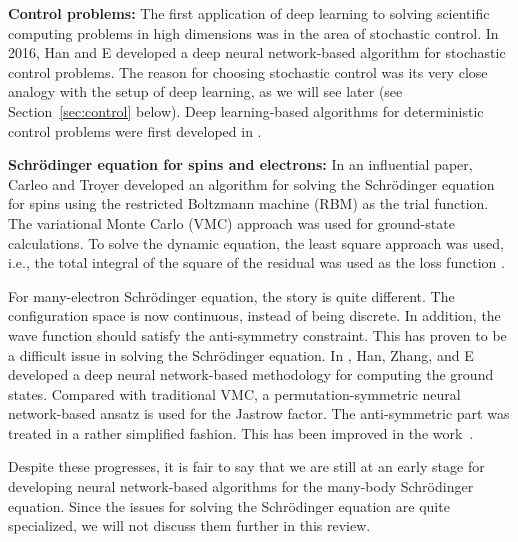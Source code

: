 \documentclass[12pt]{article}
\theoremstyle{definition}
\begin{document}
\vspace{.1in}
\noindent
{\bf Control problems:}
%
      The first application of deep learning to solving scientific computing problems in high dimensions was in the area of
      stochastic control.  In 2016, Han and E \cite{HanE2016deepcontrol} developed  a deep neural network-based algorithm for stochastic control problems.
      The reason for choosing stochastic control  was its very close analogy with the setup of deep learning, 
      as we will see later (see Section~\ref{sec:control} below).
%
       Deep learning-based algorithms for deterministic control problems were first developed in
       \cite{nakamura2019adaptive}.
       

\vspace{.1in}
\noindent
{\bf Schr\"odinger equation for spins and electrons:}
%
  In an influential paper, Carleo and Troyer  developed an algorithm for solving the Schr\"odinger
  equation for spins using the restricted Boltzmann machine (RBM) as the trial function.
  The variational Monte Carlo (VMC) approach was used for ground-state calculations.  To solve the dynamic equation,
  the  least square approach was used, i.e., the total integral of the square of the residual was used as the loss function \cite{carleo2017solving}.
  
  For many-electron Schr\"odinger equation, the story is quite different. The configuration space is now continuous, instead of being discrete.
  In addition, the wave function should satisfy the anti-symmetry constraint. This has proven to be a difficult issue in solving the 
  Schr\"odinger equation.
  In \cite{han2019solving}, Han, Zhang, and E  developed a deep neural network-based methodology for computing the ground states.
  Compared with traditional VMC, a permutation-symmetric neural network-based ansatz is used for the Jastrow factor. The
  anti-symmetric part was treated in a rather simplified fashion. This has been improved in the work~\cite{luo2019backflow, pfau2019ab, Hermann2019deep}. 
   
  Despite these progresses, it is fair to say that we are still at an early
  stage for developing  neural network-based algorithms for the many-body Schr\"odinger equation.
  Since the issues for solving the Schr\"odinger equation are quite specialized,  we will not discuss them further in this review.
    
\end{document}
